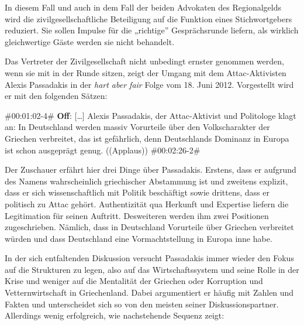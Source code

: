In diesem Fall und auch in dem Fall der beiden Advokaten des Regionalgelds wird die zivilgesellschaftliche Beteiligung auf die Funktion eines Stichwortgebers reduziert. Sie sollen Impulse für die „richtige” Gesprächsrunde liefern, als wirklich gleichwertige Gäste werden sie nicht behandelt.

Das Vertreter der Zivilgesellschaft nicht unbedingt ernster genommen werden, wenn sie mit in der Runde sitzen, zeigt der Umgang mit dem Attac-Aktivisten Alexis Passadakis in der \textit{hart aber fair} Folge vom 18. Juni 2012. Vorgestellt wird er mit den folgenden Sätzen:

\begin{description}
	\begin{linenumbers}[1]
		\item \#00:01:02-4\# \textbf{Off}: [\ldots] Alexis Passadakis, der Attac-Aktivist und Politologe klagt an: In Deutschland werden massiv Vorurteile über den Volkscharakter der Griechen verbreitet, das ist gefährlich, denn Deutschlands Dominanz in Europa ist schon ausgeprägt genug. ((Applaus)) \#00:02:26-2\# 
	\end{linenumbers}
	\label{lis:15}
\end{description}

Der Zuschauer erfährt hier drei Dinge über Passadakis. Erstens, dass er aufgrund des Namens wahrscheinlich griechischer Abstammung ist und zweitens explizit, dass er sich wissenschaftlich mit Politik beschäftigt sowie drittens, dass er politisch zu Attac gehört. Authentizität qua Herkunft und Expertise liefern die Legitimation für seinen Auftritt. Desweiteren werden ihm zwei Positionen zugeschrieben. Nämlich, dass in Deutschland Vorurteile über Griechen verbreitet würden und dass Deutschland eine Vormachtstellung in Europa inne habe.

In der sich entfaltenden Diskussion versucht Passadakis immer wieder den Fokus auf die Strukturen zu legen, also auf das Wirtschaftssystem und seine Rolle in der Krise und weniger auf die Mentalität der Griechen oder Korruption und Vetternwirtschaft in Griechenland. Dabei argumentiert er häufig mit Zahlen und Fakten und unterscheidet sich so von den meisten seiner Diskussionspartner. Allerdings wenig erfolgreich, wie nachstehende Sequenz zeigt:


